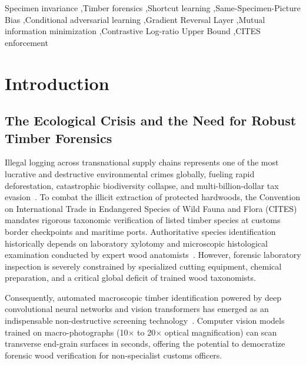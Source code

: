 \documentclass[a4paper,fleqn]{cas-sc}
\begin{document}
\begin{keywords}
Specimen invariance \sep Timber forensics \sep Shortcut learning \sep Same-Specimen-Picture Bias \sep Conditional adversarial learning \sep Gradient Reversal Layer \sep Mutual information minimization \sep Contrastive Log-ratio Upper Bound \sep CITES enforcement
\end{keywords}

\maketitle

\section{Introduction}
\label{sec:intro}

\subsection{The Ecological Crisis and the Need for Robust Timber Forensics}
Illegal logging across transnational supply chains represents one of the most lucrative and destructive environmental crimes globally, fueling rapid deforestation, catastrophic biodiversity collapse, and multi-billion-dollar tax evasion~\cite{cites}. To combat the illicit extraction of protected hardwoods, the Convention on International Trade in Endangered Species of Wild Fauna and Flora (CITES) mandates rigorous taxonomic verification of listed timber species at customs border checkpoints and maritime ports. Authoritative species identification historically depends on laboratory xylotomy and microscopic histological examination conducted by expert wood anatomists~\cite{iawa}. However, forensic laboratory inspection is severely constrained by specialized cutting equipment, chemical preparation, and a critical global deficit of trained wood taxonomists. 

Consequently, automated macroscopic timber identification powered by deep convolutional neural networks and vision transformers has emerged as an indispensable non-destructive screening technology~\cite{wu2021,fabijanska2021,wiedenhoeft2020xylotron,song2025}. Computer vision models trained on macro-photographs (10$\times$ to 20$\times$ optical magnification) can scan transverse end-grain surfaces in seconds, offering the potential to democratize forensic wood verification for non-specialist customs officers.
\end{document}
